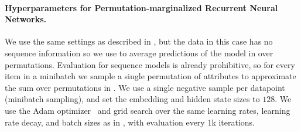 \paragraph{Hyperparameters for Permutation-marginalized Recurrent Neural Networks.} We use the same settings as described in , but the data in this case has no sequence information so we use  to average predictions of the model in \citet{bansal2016ask-the-gru:} over permutations. Evaluation for sequence models is already prohibitive, so for every item in a minibatch we sample a single permutation of attributes to approximate the sum over permutations in . We use a single negative sample per datapoint (minibatch sampling), and set the embedding and hidden state sizes to $128$. We use the Adam optimizer~\citep{kingma2015adam:} and grid search over the same learning rates, learning rate decay, and batch sizes as in , with evaluation every 1k iterations.

